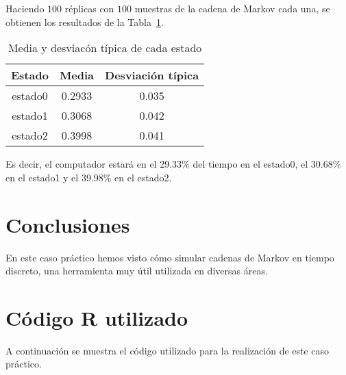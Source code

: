 \documentclass[12pt,a4paper,twoside,openright,titlepage,final]{article}
\begin{document}
Haciendo $100$ réplicas con $100$ muestras de la cadena de Markov cada una, se obtienen los resultados de la Tabla~\ref{tbl:comp}.\\

\begin{table}[htbp!]
	\centering
	\caption{Media y desviacón típica de cada estado}
	\label{tbl:comp}
	\begin{tabular}{@{}ccc@{}}
		\toprule
		\textbf{Estado} & \textbf{Media} & \textbf{Desviación típica} \\ \midrule
		estado0         & 0.2933         & 0.035                      \\
		estado1         & 0.3068         & 0.042                      \\
		estado2         & 0.3998         & 0.041                      \\ \bottomrule
	\end{tabular}
\end{table}

Es decir, el computador estará en el 29.33\% del tiempo en el estado0, el 30.68\% en el estado1 y el 39.98\% en el estado2.\\



\section{Conclusiones}

En este caso práctico hemos visto cómo simular cadenas de Markov en tiempo discreto, una herramienta muy útil utilizada en diversas áreas.

\newpage

\appendix
\section{Código R utilizado}\label{app:codigo}

A continuación se muestra el código utilizado para la realización de este caso práctico.

\inputminted{r}{../codigo/caso_iii.R}
\end{document}
